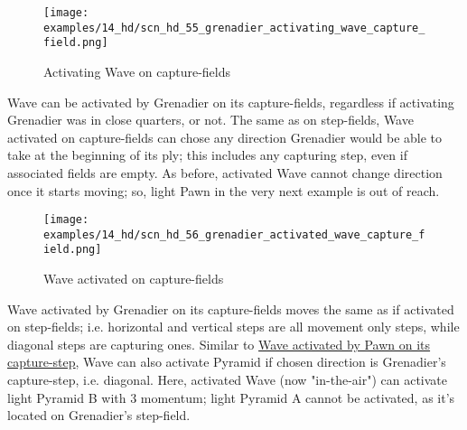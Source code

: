 \clearpage %

\vspace*{-2.1\baselineskip}
\noindent
\begin{figure}[!h]
\texttt{[image: examples/14\_hd/scn\_hd\_55\_grenadier\_activating\_wave\_capture\_field.png]}
\vspace*{-1.4\baselineskip}
\caption{Activating Wave on capture-fields}
\label{fig:scn_hd_55_grenadier_activating_wave_capture_field}
\end{figure}

\vspace*{-0.5\baselineskip}
Wave can be activated by Grenadier on its capture-fields, regardless if activating
Grenadier was in close quarters, or not. The same as on step-fields, Wave activated
on capture-fields can chose any direction Grenadier would be able to take at the
beginning of its ply; this includes any capturing step, even if associated fields
are empty.\newline
\indent
As before, activated Wave cannot change direction once it starts moving; so, light
Pawn in the very next example is out of reach.

\clearpage %

\vspace*{-2.1\baselineskip}
\noindent
\begin{figure}[!h]
\texttt{[image: examples/14\_hd/scn\_hd\_56\_grenadier\_activated\_wave\_capture\_field.png]}
\vspace*{-1.4\baselineskip}
\caption{Wave activated on capture-fields}
\label{fig:scn_hd_56_grenadier_activated_wave_capture_field}
\end{figure}

\vspace*{-0.5\baselineskip}
Wave activated by Grenadier on its capture-fields moves the same as if activated
on step-fields; i.e. horizontal and vertical steps are all movement only steps,
while diagonal steps are capturing ones. Similar to
\hyperref[fig:scn_mv_024_wave_activated_by_capture_pawn]{Wave activated by Pawn on its capture-step},
Wave can also activate Pyramid if chosen direction is Grenadier's capture-step,
i.e. diagonal.\newline
\indent
Here, activated Wave (now "in-the-air") can activate light Pyramid B with 3 momentum;
light Pyramid A cannot be activated, as it's located on Grenadier's step-field.

